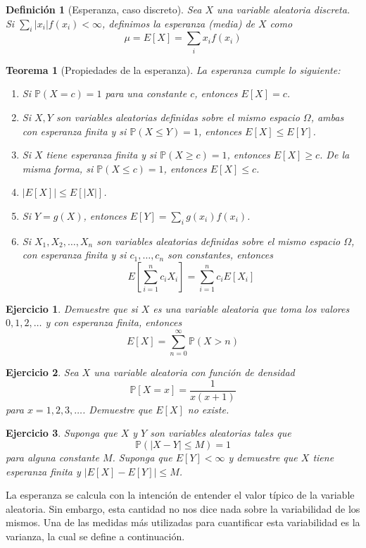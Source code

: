 \documentclass[11pt]{report}
\theoremstyle{break}
\newtheorem{definicion}{Definición}[chapter]
\newtheorem{teorema}{Teorema}[chapter]
\newtheorem{ejercicio}{Ejercicio}[chapter]
\theoremstyle{break}
\begin{document}
\begin{definicion}[Esperanza, caso discreto]
\label{definicion:esperanza caso discreto}
Sea $X$ una variable aleatoria discreta. Si $\sum_{i} |x_i|f(x_i) < \infty$, definimos la esperanza (media) de $X$ como
$$
\mu = E[X] = \sum_{i}x_if(x_i)
$$
\end{definicion}

\begin{teorema}[Propiedades de la esperanza]
\label{teorema:propiedades de la esperanza}
La esperanza cumple lo siguiente:
\begin{enumerate}[label=\alph*)]
\item Si $\mathbb{P}(X = c) = 1$ para una constante $c$, entonces $E[X] = c$.
\item Si $X,Y$ son variables aleatorias definidas sobre el mismo espacio $\Omega$, ambas con esperanza finita y si $\mathbb{P}(X \leq Y) = 1$, entonces $E[X] \leq E[Y]$.
\item Si $X$ tiene esperanza finita y si $\mathbb{P}(X \geq c) = 1$, entonces $E[X] \geq c$. De la misma forma, si $\mathbb{P}(X \leq c) = 1$, entonces $E[X] \leq c$.
\item $|E[X]| \leq E[|X|]$.
\item Si $Y = g(X)$, entonces $E[Y] = \sum_{i}g(x_i)f(x_i)$.
\item Si $X_1, X_2, \ldots, X_n$ son variables aleatorias definidas sobre el mismo espacio $\Omega$, con esperanza finita y si $c_1, \ldots, c_n$ son constantes, entonces
$$
E\left[ \sum_{i=1}^{n}c_{i}X_i \right] = \sum_{i=1}^{n}c_iE[X_i]
$$
\end{enumerate}
\end{teorema}

\begin{ejercicio}
Demuestre que si $X$ es una variable aleatoria que toma los valores $0,1,2,\ldots$ y con esperanza finita, entonces
$$
E[X] = \sum_{n=0}^{\infty} \mathbb{P}(X > n)
$$
\end{ejercicio}

\begin{ejercicio}
Sea $X$ una variable aleatoria con función de densidad
$$
\mathbb{P}[X = x] = \dfrac{1}{x(x + 1)}
$$
para $x=1,2,3,\ldots$.
Demuestre que $E[X]$ no existe.
\end{ejercicio}

\begin{ejercicio}
Suponga que $X$ y $Y$ son variables aleatorias tales que
$$
\mathbb{P}(|X - Y| \leq M) = 1
$$
para alguna constante $M$. Suponga que $E[Y] < \infty$ y demuestre que $X$ tiene esperanza finita y $|E[X] - E[Y]| \leq M$.
\end{ejercicio}
La esperanza se calcula con la intención de entender el valor típico de la variable aleatoria. Sin embargo, esta cantidad no nos dice nada sobre la variabilidad de los mismos. Una de las medidas más utilizadas para cuantificar esta variabilidad es la varianza, la cual se define a continuación.
\end{document}

